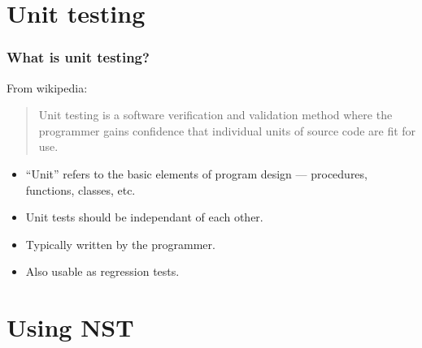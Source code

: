 \documentclass{beamer}
\begin{document}

\section{Unit testing}

\begin{frame}
  \frametitle{What is unit testing?}

  From wikipedia:
  \begin{quotation}\noindent
    Unit testing is a software verification and validation method
    where the programmer gains confidence that individual units of
    source code are fit for use.
  \end{quotation}

  \begin{itemize}
  \item ``Unit'' refers to the basic elements of program design ---
    procedures, functions, classes, etc.
  \item Unit tests should be independant of each other.
  \item Typically written by the programmer.
  \item Also usable as regression tests.
  \end{itemize}

\end{frame}

\section{Using NST}
\end{document}
